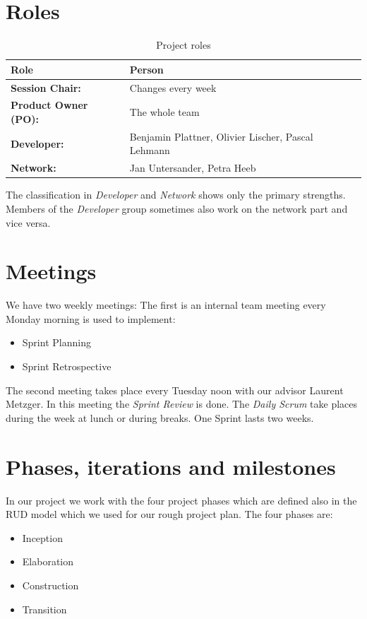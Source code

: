 \section{Roles}
\label{roles}

\begin{table}[h]
    \centering
    \caption{Project roles}
    \label{tab:project-roles}
    \begin{tabular}{l|l}
        \textbf{Role} & \textbf{Person}\\ \hline
        \textbf{Session Chair:} & Changes every week \\
        \textbf{Product Owner (PO):} & The whole team \\
        \textbf{Developer:} & Benjamin Plattner, Olivier Lischer, Pascal Lehmann\\
        \textbf{Network:} & Jan Untersander, Petra Heeb \\
    \end{tabular}
\end{table}

\noindent The classification in \textsl{Developer} and \textsl{Network} shows only the primary strengths.
Members of the \textsl{Developer} group sometimes also work on the network part and vice versa.


\section{Meetings}
\label{meetings}
We have two weekly meetings: \newline
The first is an internal team meeting every Monday morning is used to implement:
\begin{itemize}
  \item Sprint Planning
  \item Sprint Retrospective 
\end{itemize}

\noindent The second meeting takes place every Tuesday noon with our advisor Laurent Metzger.
In this meeting the \textsl{Sprint Review} is done.
\newline
\noindent The \textsl{Daily Scrum} take places during the week at lunch or during breaks.
One Sprint lasts two weeks.


\section{Phases, iterations and milestones}
\label{phases}
In our project we work with the four project phases which are defined also in the RUD model which we used for our rough project plan. The four phases are:
\begin{itemize}
    \item Inception
    \item Elaboration
    \item Construction
    \item Transition
\end{itemize}

